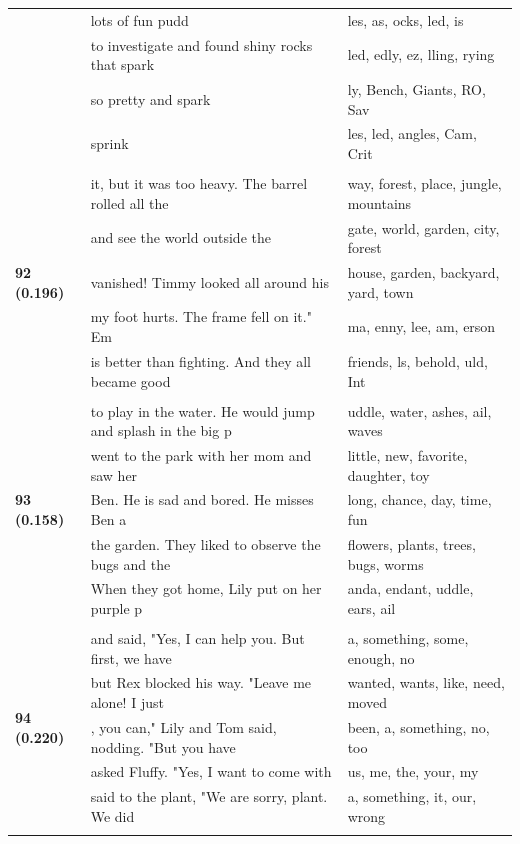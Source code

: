 \documentclass{article}
\theoremstyle{plain}
\theoremstyle{definition}
\theoremstyle{remark}
\begin{document}
\begin{longtable}{|p{}|p{}|p{}|}
& lots of fun pudd & les, as, ocks, led, is \\
& to investigate and found shiny rocks that spark & led, edly, ez, lling, rying \\
& so pretty and spark & ly,  Bench,  Giants,  RO, Sav \\
& sprink & les, led, angles, Cam,  Crit \\
& & \\
\multirow{5}{*}{\textbf{92 (0.196)}} & it, but it was too heavy. The barrel rolled all the & way,  forest, place,  jungle,  mountains \\
& and see the world outside the & gate,  world,  garden,  city,  forest \\
& vanished! Timmy looked all around his & house,  garden,  backyard,  yard,  town \\
& my foot hurts. The frame fell on it."  Em & ma, enny, lee, am, erson \\
& is better than fighting. And they all became good & friends, ls,  behold, uld,  Int \\
& & \\
\multirow{5}{*}{\textbf{93 (0.158)}} & to play in the water. He would jump and splash in the big p & uddle,  water, ashes, ail,  waves \\
& went to the park with her mom and saw her & little,  new,  favorite,  daughter,  toy \\
& Ben. He is sad and bored. He misses Ben a & long,  chance,  day,  time,  fun \\
& the garden. They liked to observe the bugs and the & flowers,  plants,  trees,  bugs,  worms \\
& When they got home, Lily put on her purple p & anda, endant, uddle, ears, ail \\
& & \\
\multirow{5}{*}{\textbf{94 (0.220)}} & and said, "Yes, I can help you. But first, we have & a,  something,  some,  enough,  no \\
& but Rex blocked his way.  "Leave me alone! I just & wanted,  wants,  like,  need,  moved \\
& , you can," Lily and Tom said, nodding. "But you have & been,  a,  something,  no,  too \\
& asked Fluffy. "Yes, I want to come with & us,  me,  the,  your,  my \\
& said to the plant, "We are sorry, plant. We did & a,  something,  it,  our,  wrong \\
& & \\

\end{longtable}
\end{document}

